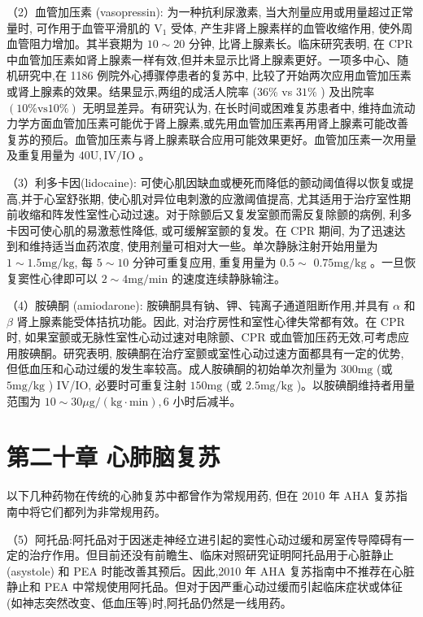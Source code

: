 \documentclass[10pt]{article}
\begin{document}
（2）血管加压素 (vasopressin): 为一种抗利尿激素, 当大剂量应用或用量超过正常量时, 可作用于血管平滑肌的 $\mathrm{V}_{1}$ 受体, 产生非肾上腺素样的血管收缩作用, 使外周血管阻力增加。其半衰期为 $10 \sim 20$ 分钟, 比肾上腺素长。临床研究表明, 在 CPR 中血管加压素如肾上腺素一样有效,但并未显示比肾上腺素更好。一项多中心、随机研究中,在 1186 例院外心搏骤停患者的复苏中, 比较了开始两次应用血管加压素或肾上腺素的效果。结果显示,两组的成活人院率 (36\% vs $31 \%$ ) 及出院率 $(10 \% \mathrm{vs} 10 \%)$ 无明显差异。有研究认为, 在长时间或困难复苏患者中, 维持血流动力学方面血管加压素可能优于肾上腺素,或先用血管加压素再用肾上腺素可能改善复苏的预后。血管加压素与肾上腺素联合应用可能效果更好。血管加压素一次用量及重复用量为 $40 \mathrm{U}, \mathrm{IV} / \mathrm{IO}$ 。

（3）利多卡因(lidocaine): 可使心肌因缺血或梗死而降低的颤动阈值得以恢复或提高,并于心室舒张期, 使心肌对异位电刺激的应激阈值提高, 尤其适用于治疗室性期前收缩和阵发性室性心动过速。对于除颤后又复发室颤而需反复除颤的病例, 利多卡因可使心肌的易激惹性降低, 或可缓解室颤的复发。在 CPR 期间, 为了迅速达到和维持适当血药浓度, 使用剂量可相对大一些。单次静脉注射开始用量为 $1 \sim 1.5 \mathrm{mg} / \mathrm{kg}$, 每 $5 \sim 10$ 分钟可重复应用, 重复用量为 $0.5 \sim$ $0.75 \mathrm{mg} / \mathrm{kg}$ 。一旦恢复窦性心律即可以 $2 \sim 4 \mathrm{mg} / \mathrm{min}$ 的速度连续静脉输注。

（4）胺碘酮 (amiodarone): 胺碘酮具有钠、钾、钝离子通道阻断作用,并具有 $\alpha$ 和 $\beta$ 肾上腺素能受体拮抗功能。因此, 对治疗房性和室性心律失常都有效。在 CPR 时, 如果室颤或无脉性室性心动过速对电除颤、CPR 或血管加压药无效,可考虑应用胺碘酮。研究表明, 胺碘酮在治疗室颤或室性心动过速方面都具有一定的优势, 但低血压和心动过缓的发生率较高。成人胺碘酮的初始单次剂量为 $300 \mathrm{mg}$ (或 $5 \mathrm{mg} / \mathrm{kg}$ ) IV/IO, 必要时可重复注射 $150 \mathrm{mg}$ (或 $2.5 \mathrm{mg} / \mathrm{kg}$ )。以胺碘酮维持者用量范围为 $10 \sim 30 \mu \mathrm{g} /(\mathrm{kg} \cdot \mathrm{min}), 6$ 小时后减半。

\section*{第二十章 心肺脑复苏}
以下几种药物在传统的心肺复苏中都曾作为常规用药, 但在 2010 年 AHA 复苏指南中将它们都列为非常规用药。

（5）阿托品:阿托品对于因迷走神经立进引起的窦性心动过缓和房室传导障碍有一定的治疗作用。但目前还没有前瞻生、临床对照研究证明阿托品用于心脏静止 (asystole) 和 PEA 时能改善其预后。因此,2010 年 AHA 复苏指南中不推荐在心脏静止和 PEA 中常规使用阿托品。但对于因严重心动过缓而引起临床症状或体征 (如神志突然改变、低血压等)时,阿托品仍然是一线用药。
\end{document}
